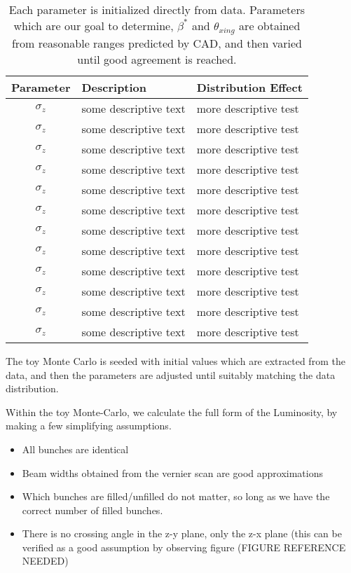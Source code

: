 \begin{table}
\centering
\begin{tabular}{c p{8cm} p{8cm} }
\toprule
\textbf{Parameter} & \textbf{Description} & \textbf{Distribution Effect}  \\
\midrule 
$\sigma_{z}$ & some descriptive text  & more descriptive test  \\
$\sigma_{z}$ & some descriptive text  & more descriptive test  \\
$\sigma_{z}$ & some descriptive text  & more descriptive test  \\
$\sigma_{z}$ & some descriptive text  & more descriptive test  \\
$\sigma_{z}$ & some descriptive text  & more descriptive test  \\
$\sigma_{z}$ & some descriptive text  & more descriptive test  \\
$\sigma_{z}$ & some descriptive text  & more descriptive test  \\
$\sigma_{z}$ & some descriptive text  & more descriptive test  \\
$\sigma_{z}$ & some descriptive text  & more descriptive test  \\
$\sigma_{z}$ & some descriptive text  & more descriptive test  \\
$\sigma_{z}$ & some descriptive text  & more descriptive test  \\
$\sigma_{z}$ & some descriptive text  & more descriptive test  \\
\bottomrule
\end{tabular}
\caption{
Each parameter is initialized directly from data. Parameters which are our goal
to determine, $\beta^{*}$ and $\theta_{xing}$ are obtained from reasonable
ranges predicted by CAD, and then varied until good agreement is reached.
}
\label{tab:simulationparameters}
\end{table}

The toy Monte Carlo is seeded with initial values which are extracted from the
data, and then the parameters are adjusted until suitably matching the data
distribution.

Within the toy Monte-Carlo, we calculate the full form of the Luminosity, by
making a few simplifying assumptions.

\begin{itemize}
  \item All bunches are identical
  \item Beam widths obtained from the vernier scan are good approximations
  \item Which bunches are filled/unfilled do not matter, so long as we have the
	correct number of filled bunches.
  \item There is no crossing angle in the z-y plane, only the z-x plane (this
	  can be verified as a good assumption by observing figure (FIGURE
	  REFERENCE NEEDED)
\end{itemize}

